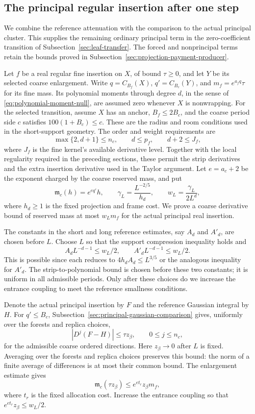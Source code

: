 \subsection{The principal regular insertion after one step}
\label{sec:regular-principal-producer}
We combine the reference attenuation with the comparison to the actual
principal cluster. This supplies the remaining ordinary principal term in
the zero-coefficient transition of Subsection~\ref{sec:leaf-transfer}.
The forced and nonprincipal terms retain the bounds proved in
Subsection~\ref{sec:projection-payment-producer}.

Let $f$ be a real regular fine insertion on $X$, of bound $\tau\ge0$,
and let $Y$ be its selected coarse enlargement. Write $q=C_{B_f}(X)$,
$q'=C_{B_c}(Y)$, and $m_f=e^{a_fq}\tau$ for its fine mass. Its
polynomial moments through degree $d$, in the sense of
\eqref{eq:polynomial-moment-null}, are assumed zero whenever $X$ is
nonwrapping. For the selected transition, assume $X$ has an anchor,
$B_f\le 2B_c$, and the coarse period side $c$ satisfies
$100(1+B_c)\le c$. These are the radius and room conditions used in
the short-support geometry. The order and weight requirements are
\[
 \max\{2,d+1\}\le n_c,\qquad d\le p_f,
 \qquad d+2\le J_f,
\]
where $J_f$ is the fine kernel's available derivative level. Together
with the local regularity required in the preceding sections, these
permit the strip derivatives and the extra insertion derivative used
in the Taylor argument. Let $e=a_c+2$ be the exponent charged by the
coarse reserved mass, and put
\[
 \mathfrak m_c(h)=e^{eq'}h,
 \qquad
 \gamma_L=\frac{L^{-2/5}}{h_d},
 \qquad w_L=\frac{\gamma_L}{2L^d},
\]
where $h_d\ge1$ is the fixed projection and frame cost. We prove a
coarse derivative bound of reserved mass at most $w_Lm_f$ for the
actual principal real insertion.

The constants in the short and long reference estimates, say $A_d$
and $A'_d$, are chosen before $L$. Choose $L$ so that the support
compression inequality holds and
\[
 A_dL^{-d-1}\le w_L/2,
 \qquad A'_dL^{-d-1}\le w_L/2.
\]
This is possible since each reduces to
$4h_d A_d\le L^{3/5}$ or the analogous inequality for $A'_d$.
The strip-to-polynomial bound is chosen before these two constants;
it is uniform in all admissible periods. Only after these choices do we increase
the entrance coupling to meet the reference smallness conditions.

Denote the actual principal insertion by $F$ and the reference
Gaussian integral by $H$. For $q'\le B_c$,
Subsection~\ref{sec:principal-gaussian-comparison} gives, uniformly over
the forests and replica choices,
\[
 |D^j(F-H)|\le\tau z_\beta,
                       \qquad 0\le j\le n_c,
\]
for the admissible coarse ordered directions. Here $z_\beta\to0$
after $L$ is fixed. Averaging over the forests and replica choices
preserves this bound: the norm of a finite average of differences is
at most their common bound. The enlargement estimate gives
\[
 \mathfrak m_c(\tau z_\beta)
       \le e^{e t_r}z_\beta m_f,
\]
where $t_r$ is the fixed allocation cost. Increase the entrance
coupling so that $e^{e t_r}z_\beta\le w_L/2$.

